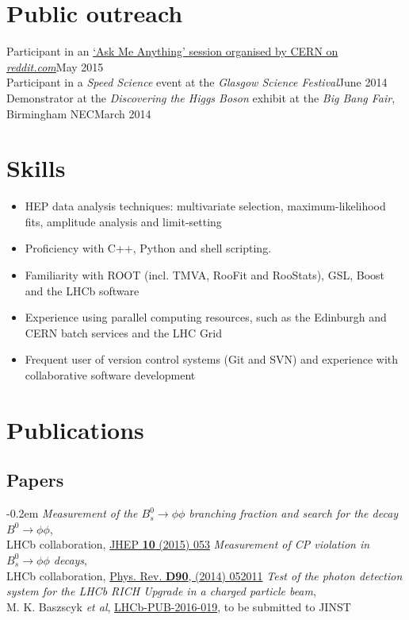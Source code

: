 \documentclass[contbibnum,titleabove]{simplecv}
\newcommand\dateditem[2]{#1\hfill#2\\}
\renewcommand{\topicmargin}{8em}
\begin{document}
	\section{Public outreach}
	\vspace{-0.5em}
	\dateditem{Participant in an \href{http://cds.cern.ch/record/2024978}{`Ask Me Anything' session organised by CERN on \textit{reddit.com}}}{May 2015}
	\dateditem{Participant in a \textit{Speed Science} event at the \textit{Glasgow Science Festival}}{June 2014}
	\dateditem{Demonstrator at the \textit{Discovering the Higgs Boson} exhibit at the \textit{Big Bang Fair}, Birmingham NEC}{March 2014}
	\vspace{-2.5em}
	\section{Skills}
	\vspace{-0.5em}
	\begin{itemize}
		\itemsep-0.3em
		\item HEP data analysis techniques: multivariate selection, maximum-likelihood fits, amplitude analysis and limit-setting
		\item Proficiency with C++, Python and shell scripting.
		\item Familiarity with ROOT (incl. TMVA, RooFit and RooStats), GSL, Boost and the LHCb software
		\item Experience using parallel computing resources, such as the Edinburgh and CERN batch services and the LHC Grid
		\item Frequent user of version control systems (Git and SVN) and experience with collaborative software development
	\end{itemize}
	\vspace{-2em}
	\section{Publications}
	\renewcommand{\topicmargin}{5em}
	\vspace{-0.5em}
	\subsection{Papers}
	\vspace{-0.5em}
	\begin{thebibliography}{1}
		\itemsep-0.2em
		\textit{Measurement of the $B^0_s \to \phi\phi$ branching fraction and search for the decay $B^0 \to \phi \phi$},\\LHCb collaboration, \href{http://dx.doi.org/10.1007/JHEP10(2015)053}{JHEP \textbf{10} (2015) 053}
		\textit{Measurement of CP violation in $B^0_s \to \phi\phi$ decays},\\LHCb collaboration, \href{http://dx.doi.org/10.1103/PhysRevD.90.052011}{Phys. Rev. \textbf{D90}, (2014) 052011}
		\textit{Test of the photon detection system for the LHCb RICH Upgrade in a charged particle beam},\\M. K. Baszscyk \textit{et al}, \href{http://cds.cern.ch/record/2197586}{LHCb-PUB-2016-019}, to be submitted to JINST
	\end{thebibliography}
	\vspace{-2em}
\end{document}
